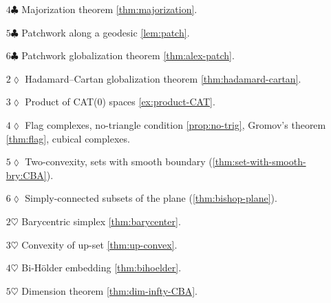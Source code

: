 \begin{itemize}
\vskip1.1mm
\item[$4\clubsuit$] Majorization theorem \ref{thm:majorization}.
\vskip1.1mm
\item[$5\clubsuit$] Patchwork along a geodesic \ref{lem:patch}.
\vskip1.1mm
\item[$6\clubsuit$] Patchwork globalization theorem \ref{thm:alex-patch}.
\vskip1.1mm
\item[$2\lozenge$] Hadamard--Cartan globalization theorem \ref{thm:hadamard-cartan}.
\vskip1.1mm
\item[$3\lozenge$] Product of CAT(0) spaces \ref{ex:product-CAT}.
\vskip1.1mm
\item[$4\lozenge$] Flag complexes, no-triangle condition \ref{prop:no-trig}, Gromov's theorem \ref{thm:flag}, cubical complexes.
\vskip1.1mm
\item[$5\lozenge$] Two-convexity, sets with smooth boundary (\ref{thm:set-with-smooth-bry:CBA}).
\vskip1.1mm
\item[$6\lozenge$] Simply-connected subsets of the plane (\ref{thm:bishop-plane}).
\vskip1.1mm
\item[$2\heartsuit$] Barycentric simplex \ref{thm:barycenter}.
\vskip1.1mm
\item[$3\heartsuit$] Convexity of up-set \ref{thm:up-convex}.
\vskip1.1mm
\item[$4\heartsuit$] Bi-H\"older embedding \ref{thm:bihoelder}.
\vskip1.1mm
\item[$5\heartsuit$] Dimension theorem \ref{thm:dim-infty-CBA}.
\end{itemize}

